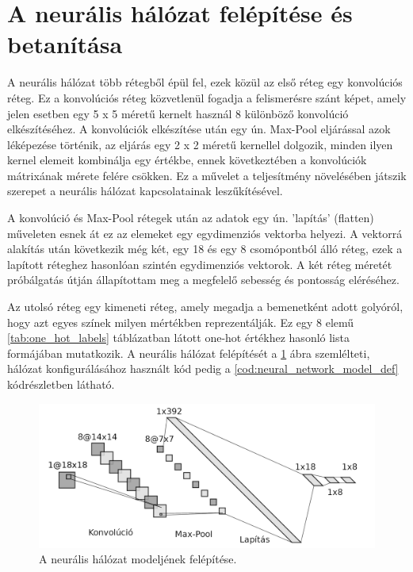 \section{A neurális hálózat felépítése és betanítása}
A neurális hálózat több rétegből épül fel, ezek közül az első réteg egy konvolúciós réteg. Ez a konvolúciós réteg közvetlenül fogadja a felismerésre szánt képet, amely jelen esetben egy 5 x 5 méretű kernelt használ 8 különböző konvolúció elkészítéséhez. A konvolúciók elkészítése után egy ún. Max-Pool eljárással azok léképezése történik, az eljárás egy 2 x 2 méretű kernellel dolgozik, minden ilyen kernel elemeit kombinálja egy értékbe, ennek következtében a konvolúciók mátrixának mérete felére csökken. Ez a művelet a teljesítmény növelésében játszik szerepet a neurális hálózat kapcsolatainak leszűkítésével.
\par A konvolúció és Max-Pool rétegek után az adatok egy ún. 'lapítás' (flatten) műveleten esnek át ez az elemeket egy egydimenziós vektorba helyezi. A vektorrá alakítás után következik még két, egy 18 és egy 8 csomópontból álló réteg, ezek a lapított réteghez hasonlóan szintén egydimenziós vektorok. A két réteg méretét próbálgatás útján állapítottam meg a megfelelő sebesség és pontosság eléréséhez.
\par Az utolsó réteg egy kimeneti réteg, amely megadja a bemenetként adott golyóról, hogy azt egyes színek milyen mértékben reprezentálják. Ez egy 8 elemű \ref{tab:one_hot_labels} táblázatban látott one-hot értékhez hasonló lista formájában mutatkozik. A neurális hálózat felépítését a \ref{fig:neural_network_model} ábra szemlélteti, hálózat konfigurálásához használt kód pedig a \ref{cod:neural_network_model_def} kódrészletben látható.

\begin{figure}[!ht]
    \centering
    \includegraphics[width=140mm, keepaspectratio]{figures/neural_network_model.png}
    \caption[A neurális hálózat modeljének felépítése.]{A neurális hálózat modeljének felépítése.\cite{alexlenail}}
    \label{fig:neural_network_model}
\end{figure}

